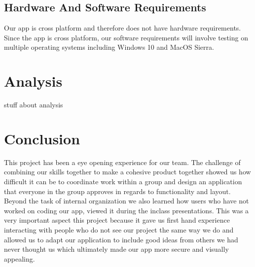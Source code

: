 \documentclass[11pt]{report}
\begin{document}
\section{Hardware And Software Requirements}
Our app is cross platform and therefore does not have hardware requirements. 
Since the app is cross platform, our software requirements will involve 
testing on multiple operating systems including Windows 10 and MacOS Sierra.



\chapter{Analysis}
stuff about analysis 



\chapter{Conclusion}
This project has been a eye opening experience for our team. The challenge of combining our skills together to make a cohesive product together showed us how difficult it can be to coordinate work within a group and design an application that everyone in the group approves in regards to functionality and layout. Beyond the task of internal organization we also learned how users who have not worked on coding our app, viewed it during the inclass presentations. This was a very important aspect this project because it gave us first hand experience interacting with people who do not see our project the same way we do and allowed us to adapt our application to include good ideas from others we had never thought us which ultimately made our app more secure and visually appealing.

\end{document}
